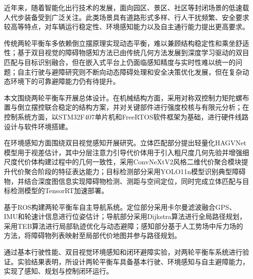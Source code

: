 \begin{cabstract}
近年来，随着智能化出行技术的发展，面向园区、景区、社区等封闭场景的低速载人代步装备受到广泛关注。此类场景具有道路形式多样、行人干扰频繁、安全要求较高等特点，对车辆运行稳定性、环境感知能力以及自主通行能力提出更高要求。

传统两轮平衡车多依赖倒立摆原理实现动态平衡，难以兼顾结构稳定性和乘坐舒适性；基于双目视觉的障碍物感知方法已由传统几何方法发展到深度学习驱动的双目匹配与目标识别融合，但在嵌入式平台上仍面临感知精度与实时性难以统一的问题；自主行驶与避障研究则不断向动态障碍处理和安全决策优化发展，但在复杂动态环境下的可靠避障能力仍有待提升。

本文围绕两轮平衡车开展总体设计。在机械结构方面，采用对称双控制力矩陀螺布置与倒立摆控联合稳定的结构方案，并对关键部件进行强度校核与有限元分析；在控制系统方面，以STM32F407单片机和FreeRTOS软件框架为基础，进行硬件线路设计与软件环境搭建。

在环境感知方面围绕双目视觉感知开展研究。立体匹配部分提出轻量化HAGVNet模型用于视差估计，其中分层注意力引导代价体用于引入粗尺度几何先验并增强细尺度代价体构建过程中的几何一致性，采用ConvNeXtV2风格二维代价聚合模块提升代价聚合阶段的特征表达能力；目标检测部分采用YOLO11n模型识别典型障碍物，并结合深度图信息实现障碍物检测、测距与空间定位，同时完成立体匹配与目标检测模型的TensorRT加速部署。

基于ROS构建两轮平衡车自主导航系统。定位部分采用卡尔曼滤波融合GPS、IMU和轮速计信息进行位姿估计；导航部分采用Dijkstra算法进行全局路径规划，采用TEB算法进行局部轨迹优化与动态避障；感知部分基于人工势场中斥力场的方法，将障碍物列表映射至局部代价地图并参与路径规划。

通过基本行驶性能、双目视觉环境感知和闭环避障实验，对两轮平衡车系统进行验证。实验结果表明，所设计两轮平衡车具备基本行驶、环境感知与自主避障能力，实现了感知、规划与控制闭环运行。
\end{cabstract}

